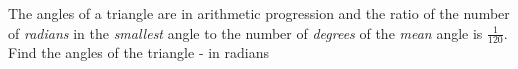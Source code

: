 
%
%
%
%
% 
% 

\question The angles of a triangle are in arithmetic progression and the ratio of 
the number of \textit{radians} in the \textit{smallest} angle to the number of 
\textit{degrees} of the \textit{mean} angle is $\frac{1}{120}$. Find the angles 
of the triangle - in radians 

\insertQR{}

\ifprintanswers
\fi 

